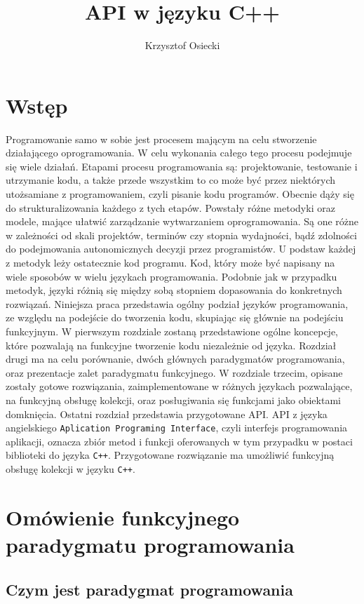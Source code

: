 \documentclass[a4paper,10pt]{report}
\title{API w języku C++}
\author{Krzysztof Osiecki}
\begin{document}
\pagestyle{fancy}\lhead{}\rightmark

\maketitle
\tableofcontents{}
\chapter*{Wstęp}
Programowanie samo w sobie jest procesem mającym na celu stworzenie działającego oprogramowania. W celu wykonania całego tego procesu podejmuje się wiele działań. Etapami procesu programowania są: projektowanie, testowanie i utrzymanie kodu, a także przede wszystkim to co może być przez niektórych utożsamiane z programowaniem, czyli pisanie kodu programów. Obecnie dąży się do strukturalizowania każdego z tych etapów. Powstały różne metodyki oraz modele, mające ułatwić zarządzanie wytwarzaniem oprogramowania. Są one różne w zależności od skali projektów, terminów czy stopnia wydajności, bądź zdolności do podejmowania autonomicznych decyzji przez programistów. U podstaw każdej z metodyk leży ostatecznie kod programu. Kod, który może być napisany na wiele sposobów w wielu językach programowania. Podobnie jak w przypadku metodyk, języki różnią się między sobą stopniem dopasowania do konkretnych rozwiązań. Niniejsza praca przedstawia ogólny podział języków programowania, ze względu na podejście do tworzenia kodu, skupiając się głównie na podejściu funkcyjnym. W pierwszym rozdziale zostaną przedstawione ogólne koncepcje, które pozwalają na funkcyjne tworzenie kodu niezależnie od języka. Rozdział drugi ma na celu porównanie, dwóch głównych paradygmatów programowania, oraz prezentacje zalet paradygmatu funkcyjnego. W rozdziale trzecim, opisane zostały gotowe rozwiązania, zaimplementowane w różnych językach pozwalające, na funkcyjną obsługę kolekcji, oraz posługiwania się funkcjami jako obiektami domknięcia. Ostatni rozdział przedstawia przygotowane API. API z języka angielskiego \verb|Aplication Programing Interface|, czyli interfejs programowania aplikacji, oznacza zbiór metod i funkcji oferowanych w tym przypadku w postaci biblioteki do języka \verb|C++|. Przygotowane rozwiązanie ma umożliwić funkcyjną obsługę kolekcji w języku \verb|C++|. 
\chapter{Omówienie funkcyjnego paradygmatu programowania}
\section{Czym jest paradygmat programowania}
\end{document}
